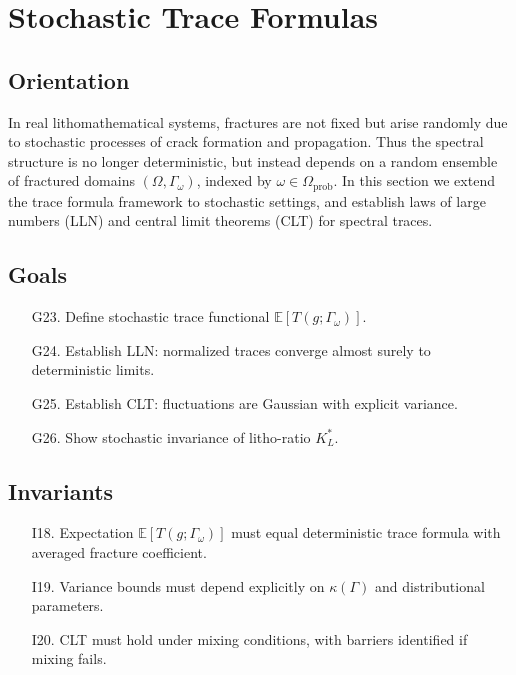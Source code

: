 \section{Stochastic Trace Formulas}
\label{sec:stochastic-traces}

\subsection*{Orientation}

In real lithomathematical systems, fractures are not fixed but arise randomly due to stochastic processes of crack formation and propagation. 
Thus the spectral structure is no longer deterministic, but instead depends on a random ensemble of fractured domains $(\Omega,\Gamma_\omega)$, indexed by $\omega \in \Omega_{\mathrm{prob}}$. 
In this section we extend the trace formula framework to stochastic settings, and establish laws of large numbers (LLN) and central limit theorems (CLT) for spectral traces.

\subsection*{Goals}

\begin{itemize}
  \item[G23.] Define stochastic trace functional $\mathbb{E}[T(g;\Gamma_\omega)]$. 
  \item[G24.] Establish LLN: normalized traces converge almost surely to deterministic limits. 
  \item[G25.] Establish CLT: fluctuations are Gaussian with explicit variance. 
  \item[G26.] Show stochastic invariance of litho-ratio $K_L^*$. 
\end{itemize}

\subsection*{Invariants}

\begin{itemize}
  \item[I18.] Expectation $\mathbb{E}[T(g;\Gamma_\omega)]$ must equal deterministic trace formula with averaged fracture coefficient. 
  \item[I19.] Variance bounds must depend explicitly on $\kappa(\Gamma)$ and distributional parameters. 
  \item[I20.] CLT must hold under mixing conditions, with barriers identified if mixing fails. 
\end{itemize}

